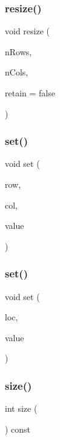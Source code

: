 \subsubsection{\texorpdfstring{resize()}{resize()}}
{\footnotesize\ttfamily void resize (\begin{DoxyParamCaption}\item[{int}]{n\+Rows,  }\item[{int}]{n\+Cols,  }\item[{bool}]{retain = {\ttfamily false} }\end{DoxyParamCaption})}

\mbox{\label{classGrid_a6f5cee26d171f36d280a15c51332efc2}} 
\subsubsection{\texorpdfstring{set()}{set()}\hspace{0.1cm}{\footnotesize\ttfamily [1/2]}}
{\footnotesize\ttfamily void set (\begin{DoxyParamCaption}\item[{int}]{row,  }\item[{int}]{col,  }\item[{const Value\+Type \&}]{value }\end{DoxyParamCaption})}

\mbox{\label{classGrid_a02a61287a9aee6a1ff7e8a8325ce094d}} 
\subsubsection{\texorpdfstring{set()}{set()}\hspace{0.1cm}{\footnotesize\ttfamily [2/2]}}
{\footnotesize\ttfamily void set (\begin{DoxyParamCaption}\item[{const \mbox{\hyperlink{structGridLocation}{Grid\+Location}} \&}]{loc,  }\item[{const Value\+Type \&}]{value }\end{DoxyParamCaption})}

\mbox{\label{classGrid_af9593d4a5ff4274efaf429cb4f9e57cc}} 
\subsubsection{\texorpdfstring{size()}{size()}}
{\footnotesize\ttfamily int size (\begin{DoxyParamCaption}{ }\end{DoxyParamCaption}) const}

